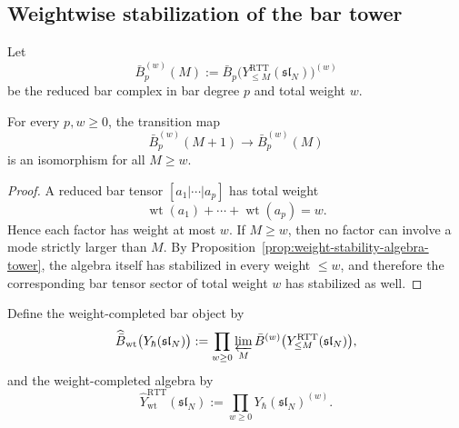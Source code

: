 \subsection{Weightwise stabilization of the bar tower}

Let
\begin{equation}
\bar B_p^{(w)}(M):=
\bar B_p\big(Y^{\mathrm{RTT}}_{\le M}(\mathfrak{sl}_N)\big)^{(w)}
\end{equation}
be the reduced bar complex in bar degree $p$ and total weight $w$.

\begin{lemma}
\ClaimStatusProvedHere
\label{lem:weight-stability-bar-tower}
For every $p,w\ge 0$, the transition map
\begin{equation}
\bar B_p^{(w)}(M+1)\longrightarrow \bar B_p^{(w)}(M)
\end{equation}
is an isomorphism for all $M\ge w$.
\end{lemma}

\begin{proof}
A reduced bar tensor $[a_1|\cdots|a_p]$ has total weight
\begin{equation}
\operatorname{wt}(a_1)+\cdots+\operatorname{wt}(a_p)=w.
\end{equation}
Hence each factor has weight at most $w$. If $M\ge w$, then no factor can
involve a mode strictly larger than $M$. By
Proposition~\ref{prop:weight-stability-algebra-tower}, the algebra itself
has stabilized in every weight $\le w$, and therefore the corresponding
bar tensor sector of total weight $w$ has stabilized as well.
\end{proof}

Define the weight-completed bar object by
\begin{equation}
\widehat{\bar B}_{\mathrm{wt}}\big(Y_\hbar(\mathfrak{sl}_N)\big)
:=
\prod_{w\ge 0}\varprojlim_M \bar B^{(w)}\big(Y^{\mathrm{RTT}}_{\le M}(\mathfrak{sl}_N)\big),
\end{equation}
and the weight-completed algebra by
\begin{equation}
\widehat Y^{\mathrm{RTT}}_{\mathrm{wt}}(\mathfrak{sl}_N)
:=
\prod_{w\ge 0}Y_\hbar(\mathfrak{sl}_N)^{(w)}.
\end{equation}

